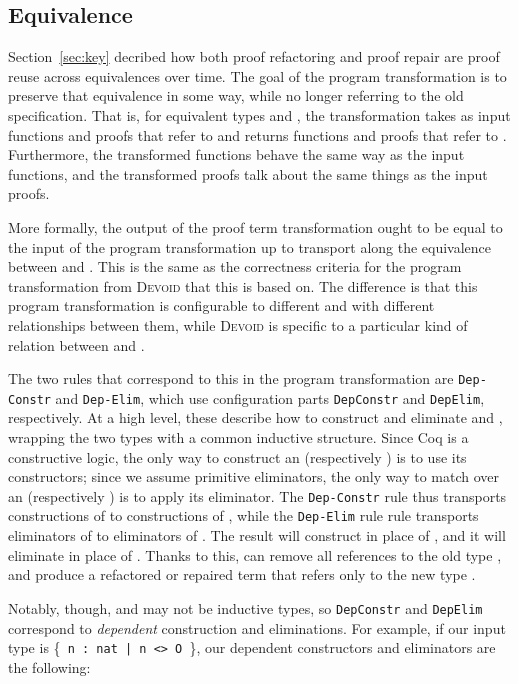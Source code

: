 \subsection{Equivalence}
\label{sec:equivalence}

Section~\ref{sec:key} decribed how both proof refactoring and proof repair are proof reuse across
equivalences over time.
The goal of the program transformation is to preserve that equivalence in some way, while no longer referring to the old specification.
That is, for equivalent types \A and \B, the transformation takes as input functions and proofs
that refer to \A and returns functions and proofs that refer to \B.
Furthermore, the transformed functions behave the same way as the input functions,
and the transformed proofs talk about the same things as the input proofs.

More formally, the output of the proof term transformation ought to be equal to the input of the program transformation
up to transport along the equivalence between \A and \B.
This is the same as the correctness criteria for the program transformation from \textsc{Devoid} that this is based on.
The difference is that this program transformation is configurable to different \A and \B with different relationships between them,
while \textsc{Devoid} is specific to a particular kind of relation between \A and \B.

The two rules that correspond to this in the program transformation are \lstinline{Dep-Constr} and \lstinline{Dep-Elim},
which use configuration parts \lstinline{DepConstr} and \lstinline{DepElim}, respectively.
At a high level, these describe how to construct and eliminate \A and \B, wrapping the two types with a common inductive structure.
Since Coq is a constructive logic, the only way to construct an \A (respectively \B) is to use its
constructors; since we assume primitive eliminators, the only way to match over an \A (respectively \B)
is to apply its eliminator. 
The \lstinline{Dep-Constr} rule thus transports constructions of \A to constructions of \B,
while the \lstinline{Dep-Elim} rule rule transports eliminators of \A to eliminators of \B.
The result will construct \B in place of \A, and it will eliminate \B in place of \A.
Thanks to this, \toolname can remove all references to the old type \A,
and produce a refactored or repaired term that refers only to the new type \B.

Notably, though, \A and \B may not be inductive types, so \lstinline{DepConstr} and \lstinline{DepElim}
correspond to \textit{dependent} construction and eliminations.
For example, if our input type is \{\lstinline{ n : nat | n <> O }\}, our dependent constructors and eliminators are the following:

